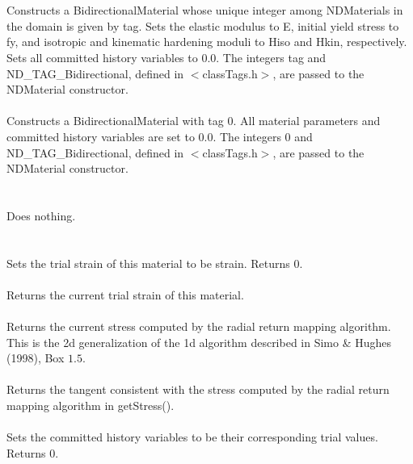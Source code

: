 \\
 \\
Constructs a BidirectionalMaterial whose unique integer among
NDMaterials in the domain is given by \p tag.
Sets the elastic modulus to \p E, initial yield stress
to \p fy, and isotropic and kinematic hardening moduli to 
\p Hiso and \p Hkin, respectively. Sets all committed history
variables to $0.0$. The integers \p tag and ND\_TAG\_Bidirectional, 
defined in $<$classTags.h$>$, are passed to the NDMaterial 
constructor. \\ 

 \\
Constructs a BidirectionalMaterial with tag 0. All material parameters
and committed history variables are set to $0.0$. The integers 0 and 
ND\_TAG\_Bidirectional, defined in $<$classTags.h$>$, are passed to 
the NDMaterial constructor. \\ 

 \\
 \\
Does nothing. \\

 \\
 \\
Sets the trial strain of this material to be \p strain. Returns 0. \\

 \\
Returns the current trial strain of this material. \\

 \\
Returns the current stress computed by the radial return mapping algorithm. This
is the 2d generalization of the 1d algorithm described in Simo \& Hughes (1998),
Box $1.5$. \\

 \\
Returns the tangent consistent with the stress computed by the radial
return mapping algorithm in getStress(). \\

 \\
Sets the committed history variables to be their corresponding trial
values. Returns 0. \\

